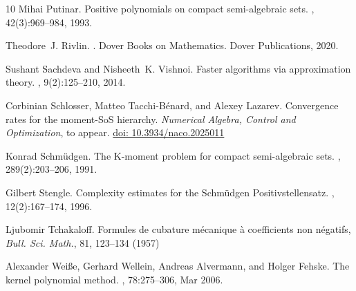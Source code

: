 \documentclass[11pt]{article}
\theoremstyle{definition}
\begin{document}
\begin{thebibliography}{10}
Mihai Putinar.
\newblock Positive polynomials on compact semi-algebraic sets.
, 42(3):969--984, 1993.

Theodore~J. Rivlin.
.
\newblock Dover Books on Mathematics. Dover Publications, 2020.

Sushant Sachdeva and Nisheeth~K. Vishnoi.
\newblock Faster algorithms via approximation theory.
,
  9(2):125--210, 2014.


{
Corbinian Schlosser, Matteo Tacchi-B\'enard, and Alexey Lazarev. \newblock Convergence rates for the moment-SoS hierarchy.
\newblock \emph{Numerical Algebra, Control and Optimization}, to appear. \url{doi: 10.3934/naco.2025011}
}

Konrad Schm\"udgen.
\newblock The {K}-moment problem for compact semi-algebraic sets.
, 289(2):203--206, 1991.

Gilbert Stengle.
\newblock Complexity estimates for the {S}chm\"udgen {P}ositivstellensatz.
, 12(2):167--174, 1996.

{
Ljubomir Tchakaloff. Formules de cubature {m}\'{e}canique  \`{a} coefficients non n\'{e}gatifs, \emph{Bull. Sci. Math.},
81, 123--134 (1957)
}

Alexander Wei\ss{}e, Gerhard Wellein, Andreas Alvermann, and Holger Fehske.
\newblock The kernel polynomial method.
, 78:275--306, Mar 2006.

\end{thebibliography}
\end{document}
